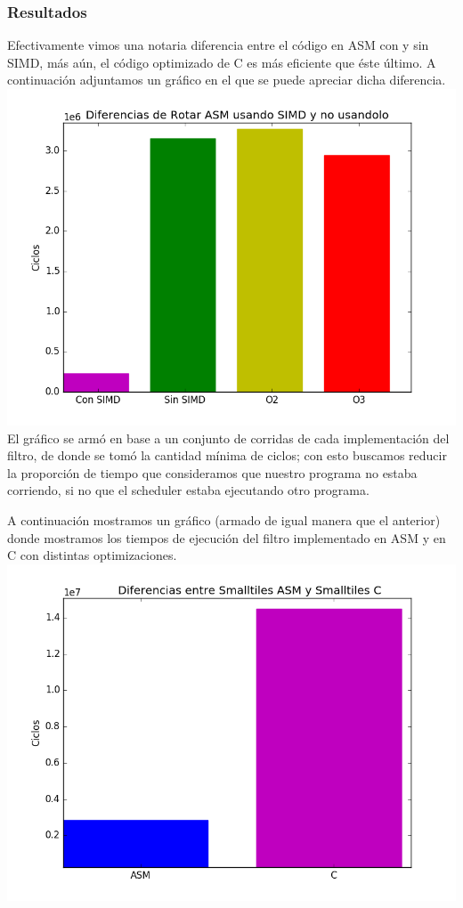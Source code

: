 \subsubsection{Resultados}
	Efectivamente vimos una notaria diferencia entre el código en ASM con y sin SIMD, más aún, el código optimizado de C es más eficiente que éste último.
	A continuación adjuntamos un gráfico en el que se puede apreciar dicha diferencia.
	\includegraphics[width = 15 cm, height = 10 cm]{imagenes/SinSIMD.png}
	El gráfico se armó en base a un conjunto de corridas de cada implementación del filtro, de donde se tomó la cantidad mínima de ciclos; con esto buscamos reducir la proporción de tiempo que consideramos que nuestro programa no estaba corriendo, si no que el scheduler estaba ejecutando otro programa.
	
	A continuación mostramos un gráfico (armado de igual manera que el anterior) donde mostramos los tiempos de ejecución del filtro implementado en ASM y en C con distintas optimizaciones.
	\includegraphics[width = 15 cm, height = 10 cm]{imagenes/ASMvsC.png}